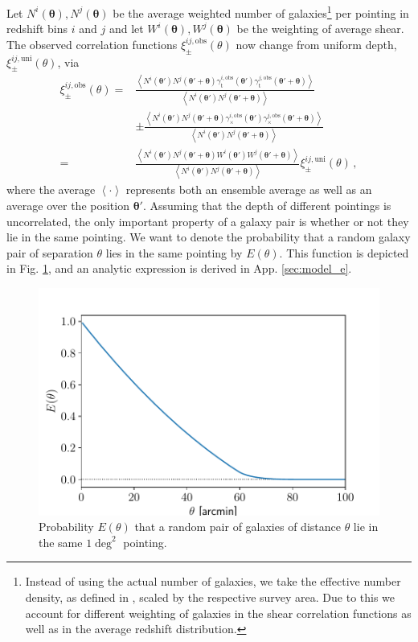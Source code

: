 \documentclass{aa}
\renewcommand{\rm}{\mathrm}
\def\b#1{\bm{#1}}
\def\la{\left<}
\def\ra{\right>}
\def\bthp{\b \theta' + \b \theta}
\def\bth{\b \theta'}
\begin{document}
Let $N^i(\b \theta),N^j(\b\theta)$ be the average weighted number of galaxies\footnote{Instead of using the actual number of galaxies, we take the effective number density, as defined in \citet{Kuijken:2015}, scaled by the respective survey area. Due to this we account for different weighting of galaxies in the shear correlation functions as well as in the average redshift distribution.} per pointing in redshift bins $i$ and $j$ and let $W^i(\b \theta),W^j(\b\theta)$ be the weighting of average shear. The observed correlation functions $\xi^{ij,\text{obs}}_\pm(\theta)$ now change from uniform depth, $\xi_\pm^{ij,\rm{uni}}(\theta)$, via %
\begin{align}
\xi^{ij,\text{obs}}_\pm(\theta) = & \frac{\la N^i(\bth)N^j(\bthp)\gamma^{i,\rm{obs}}_{\rm t}(\bth)\gamma^{j,\rm{obs}}_{\rm t}(\bthp)\ra }{\la N^i(\bth)N^j(\bthp)\ra} \\
 & \pm \frac{\la N^i(\bth)N^j(\bthp)\gamma^{i,\rm{obs}}_\times(\bth)\gamma^{j,\rm{obs}}_\times(\bthp)\ra }{\la N^i(\bth)N^j(\bthp)\ra} \nonumber\\
 = & \frac{\la N^i(\bth)N^j(\bthp)W^i(\bth)W^j(\bthp)\ra}{\la N^i(\bth)N^j(\bthp)\ra} \xi_{\pm}^{ij,\rm{uni}}(\theta) \, ,
 \label{eq:xipmblub1}
 \end{align}
 where the average $\la\cdot\ra$ represents both an ensemble average as well as an average over the position $\bth$.
 Assuming that the depth of different pointings is uncorrelated, the only important property of a galaxy pair is whether or not they lie in the same pointing. We want to denote the probability that a random galaxy pair of separation $\theta$ lies in the same pointing by $E(\theta)$. This function is depicted in Fig. \ref{fig:eoftheta_lin}, and an analytic expression is derived in App. \ref{sec:model_e}.
 
\begin{figure}
 \centering
 \includegraphics[width=0.9\linewidth]{images/eoftheta.pdf}
 \caption{Probability $E(\theta)$ that a random pair of galaxies of distance $\theta$ lie in the same $1\deg ^2$ pointing.}
 \label{fig:eoftheta_lin}
\end{figure}
\end{document}
